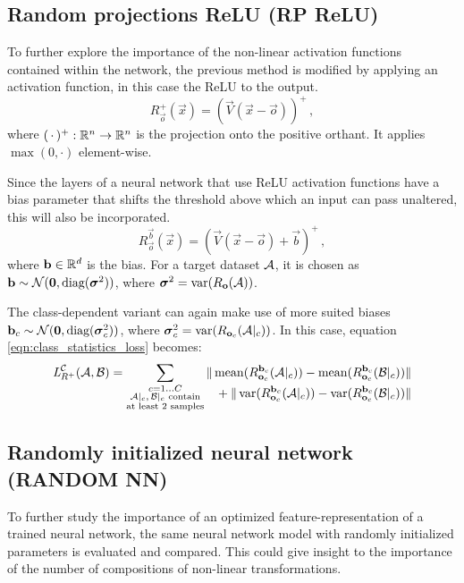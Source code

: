 \subsection{Random projections ReLU (RP ReLU)}
To further explore the importance of the non-linear activation functions contained within the network,
the previous method is modified by applying an activation function, in this case the ReLU to the output.
% 
\[
    R_{\vec o}^+ (\vec x) = (\vec V (\vec x - \vec o))^+ \,,
\]
where $(\,\cdot\,)^+ :\R^n \to \R^n$ is the projection onto the positive orthant. It applies $\max(0, \cdot)$ element-wise.

Since the layers of a neural network that use ReLU activation functions have a bias parameter that shifts the threshold above which an input can pass unaltered, this will also be incorporated.
\[
    R_{\vec o}^{\vec b} (\vec x) = (\vec V (\vec x - \vec o) + \vec b)^+ \,,
\]
where $\vec b \in \R^d$ is the bias. For a target dataset $\set A$, it is chosen as $\vec b \sim \mathcal N(\vec 0, \textnormal{diag}(\boldsymbol \sigma ^2))$, 
where $\boldsymbol \sigma ^2 = \var ({R_{\vec o}(\set A)})$.

The class-dependent variant can again make use of more suited biases $\vec b_c \sim \mathcal N( \vec 0, \textnormal{diag}(\boldsymbol \sigma _c^2))$, 
where $\boldsymbol \sigma_c ^2 = \var ({R_{\vec o_c}(\set A|_c)})$.
In this case, equation \ref{eqn:class_statistics_loss} becomes:
% 
\begin{equation*}
    \loss _{R^+} ^{\mathcal C} (\set A, \set B) =
    \sum _{\substack{c = 1 \dots C \\ \set A|_c,\, \set B|_c \text{ contain} \\ \text{at least 2 samples}}}
    \begin{alignedat}[t]{1}
        \|\mean ({R_{\vec o_c}^{\vec b_c} (\set A|_c)}) - \mean ({R_{\vec o_c}^{\vec b_c} (\set B|_c)}) &\| \\
        {} + \|\var ({R_{\vec o_c}^{\vec b_c} (\set A|_c)}) - \var ({R_{\vec o_c}^{\vec b_c} (\set B|_c)}) &\| 
    \end{alignedat}
\end{equation*}

\subsection{Randomly initialized neural network (RANDOM NN)}
To further study the importance of an optimized feature-representation of a trained neural network, 
the same neural network model with randomly initialized parameters is evaluated and compared.
This could give insight to the importance of the number of compositions of non-linear transformations.

